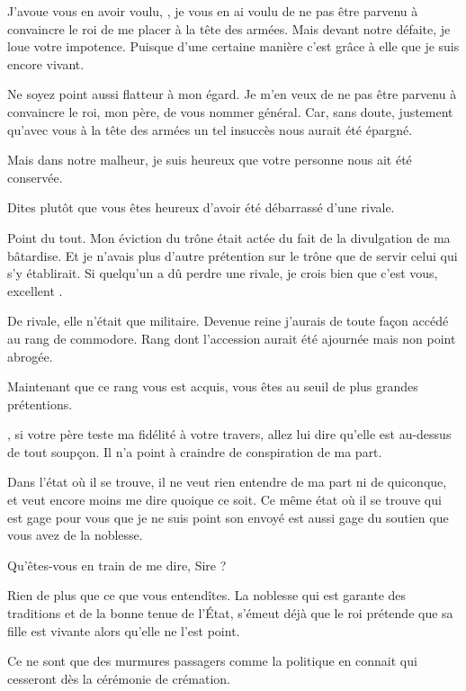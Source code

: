 \begin{drama}
  \generalspeaks J’avoue vous en avoir voulu, \elena, je vous en ai voulu de ne pas être parvenu à convaincre le roi de me placer à la tête des armées. Mais devant notre défaite, je loue votre impotence. Puisque d’une certaine manière c’est grâce à elle que je suis encore vivant.

  \elenaspeaks Ne soyez point aussi flatteur à mon égard. Je m’en veux de ne pas être parvenu à convaincre le roi, mon père, de vous nommer général. Car, sans doute, justement qu’avec vous à la tête des armées un tel insuccès nous aurait été épargné.

  Mais dans notre malheur, je suis heureux que votre personne nous ait été conservée.

  \generalspeaks Dites plutôt que vous êtes heureux d’avoir été débarrassé d’une rivale.

  \elenaspeaks Point du tout. Mon éviction du trône était actée du fait de la divulgation de ma bâtardise. Et je n’avais plus d’autre prétention sur le trône que de  servir celui qui s’y établirait. Si quelqu’un a dû perdre une rivale, je crois bien que c’est vous, excellent \general.

  \generalspeaks De rivale, elle n’était que militaire. Devenue reine j’aurais de toute façon accédé au rang de commodore. Rang dont l’accession aurait été ajournée mais non point abrogée.

  \elenaspeaks Maintenant que ce rang vous est acquis, vous êtes au seuil de plus grandes prétentions.

  \generalspeaks \elena{}, si votre père teste ma fidélité à votre travers, allez lui dire qu’elle est au-dessus de tout soupçon. Il n’a point à craindre de conspiration de ma part.

  \elenaspeaks Dans l’état où il se trouve, il ne veut rien entendre de ma part ni de quiconque, et veut encore moins me dire quoique ce soit. Ce même état où il se trouve qui est gage pour vous que je ne suis point son envoyé est aussi gage du soutien que vous avez de la noblesse.

  \generalspeaks Qu’êtes-vous en train de me dire, Sire ?

  \elenaspeaks Rien de plus que ce que vous entendîtes. La noblesse qui est garante des traditions et de la bonne tenue de l’État, s’émeut déjà que le roi prétende que sa fille est vivante alors qu’elle ne l’est point.

  \generalspeaks Ce ne sont que des murmures passagers comme la politique en connait qui cesseront dès la cérémonie de crémation.


\end{drama}
